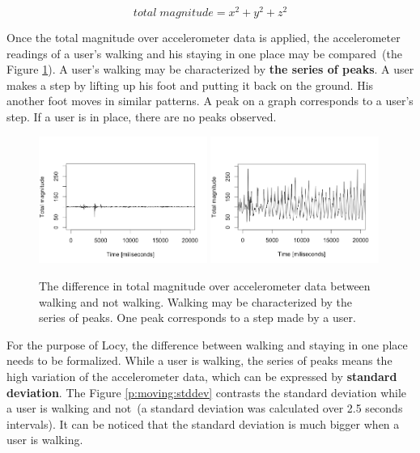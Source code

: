 \begin{equation}\label{e:total_magnitude}
total\;magnitude = x^2 + y^2 + z^2
\end{equation}

Once the total magnitude over accelerometer data is applied, the accelerometer readings of a user's walking and his staying in one place may be compared\ (the Figure \ref{p:moving:magnitude}). A user's walking may be characterized by \textbf{the series of peaks}. A user makes a step by lifting up his foot and putting it back on the ground. His another foot moves in similar patterns. A peak on a graph corresponds to a user's step. If a user is in place, there are no peaks observed. 

\begin{figure}[H]
\centering
\includegraphics[width=0.49\textwidth, scale=0.6]{plots/no_walking}
\includegraphics[width=0.49\textwidth, scale=0.6]{plots/walking}
\caption{\label{p:moving:magnitude} The difference in total magnitude over accelerometer data between walking and not walking. Walking may be characterized by the series of peaks. One peak corresponds to  a step made by a user.}
\end{figure}

For the purpose of Locy, the difference between walking and staying in one place needs to be formalized. While a user is walking, the series of peaks means the high variation of the accelerometer data, which can be expressed by \textbf{standard deviation}. The Figure \ref{p:moving:stddev} contrasts the standard deviation while a user is walking and not\ (a standard deviation was calculated over 2.5 seconds intervals). It can be noticed that the standard deviation is much bigger when a user is walking.

